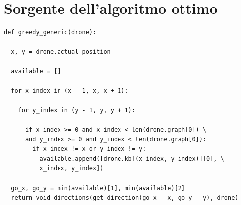 \section{Sorgente dell'algoritmo ottimo}
\begin{verbatim}
def greedy_generic(drone):

  x, y = drone.actual_position

  available = []

  for x_index in (x - 1, x, x + 1):

    for y_index in (y - 1, y, y + 1):

      if x_index >= 0 and x_index < len(drone.graph[0]) \
      and y_index >= 0 and y_index < len(drone.graph[0]):
        if x_index != x or y_index != y:
          available.append([drone.kb[(x_index, y_index)][0], \
          x_index, y_index])

  go_x, go_y = min(available)[1], min(available)[2]
  return void_directions(get_direction(go_x - x, go_y - y), drone)

\end{verbatim}
	
